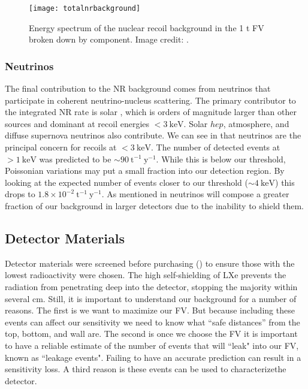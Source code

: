 \begin{figure}
\centering
\texttt{[image: totalnrbackground]}
\caption{Energy spectrum of the nuclear recoil background in the 1 t FV broken down by component.  Image credit: .}
\label{fig:backgrounds_nuclear_muon_induced_nr_rate}
\end{figure}



\subsubsection{Neutrinos}
\label{subsubsec:backgrounds_nuclear_neutrinos}
The final contribution to the NR background comes from neutrinos that participate in coherent neutrino-nucleus scattering.  The primary
contributor to the integrated NR rate is solar , which is orders of magnitude larger than other sources and dominant at
recoil energies $< 3\ \mathrm{keV}$.  Solar $hep$, atmosphere, and diffuse supernova neutrinos also contribute.  We can see in
 that neutrinos are the principal concern for recoils at $< 3\ \mathrm{keV}$.  The
number of detected events at $> 1\ \mathrm{keV}$ was predicted to be ${\sim} 90\ \mathrm{t^{-1}\ y^{-1}}$.  While this is below our
threshold, Poissonian variations may put a small fraction into our detection region.  By looking at the expected number of events closer
to our threshold (${\sim} 4\ \mathrm{keV}$) this drops to $1.8 \times 10^{-2}\ \mathrm{t^{-1}\ y^{-1}}$.  As mentioned in
 neutrinos will compose a greater fraction of our background in larger detectors
due to the inability to shield them.



\subsection{Detector Materials}
\label{subsec:backgrounds_detector_materials}
Detector materials were screened before purchasing () to ensure
those with the lowest radioactivity were chosen.  The high self-shielding of LXe prevents the radiation from penetrating deep into
the detector, stopping the majority within several cm.  Still, it is important to understand our background for a number of reasons.  The
first is we want to maximize our FV.  But because including these events can affect our sensitivity we need to know
what ``safe distances'' from the top, bottom, and wall are.  The second is once we choose the FV it is important to have a reliable
estimate
of the number of events that will ``leak" into our FV, known as ``leakage events".  Failing to have an accurate prediction can result in
a sensitivity loss.  A third reason is these events can be used to characterizethe detector.

